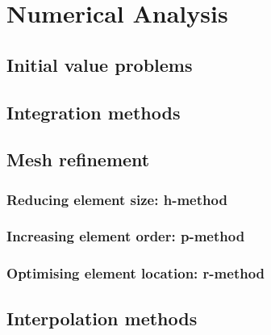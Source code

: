 \section{Numerical Analysis}

\subsection{Initial value problems}

\subsection{Integration methods}

\subsection{Mesh refinement}
\subsubsection{Reducing element size: h-method}
\subsubsection{Increasing element order: p-method}
\subsubsection{Optimising element location: r-method}

\subsection{Interpolation methods}